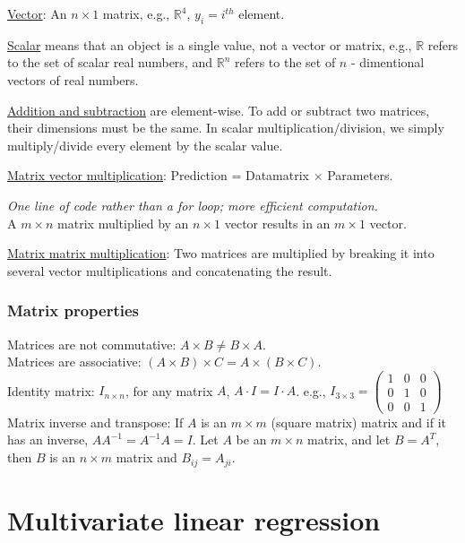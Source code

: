 \underline{Vector}: An $n \times 1$ matrix, e.g., $\mathbb{R}^{4}$, $y_i = i^{th}$ element.

\underline{Scalar} means that an object is a single value, not a vector or matrix, e.g., $\mathbb{R}$ refers to the set of scalar real numbers, and $\mathbb{R}^{n}$ refers to the set of $\mathit{n}$ - dimentional vectors of real numbers.

\underline{Addition and subtraction} are element-wise. To add or subtract two matrices, their dimensions must be the same. In scalar multiplication/division, we simply multiply/divide every element by the scalar value.

\underline{Matrix vector multiplication}: Prediction = Datamatrix $\times$ Parameters. 

\emph{\textcolor{Bittersweet}{One line of code rather than a for loop; more efficient computation.}} \\
A $m \times n$ matrix multiplied by an $n \times 1$ vector results in an $m \times 1$ vector.

\underline{Matrix matrix multiplication}: Two matrices are multiplied by breaking it into several vector multiplications and concatenating the result.

\subsubsection{Matrix properties}
Matrices are not commutative: $A \times B \neq B \times A$.\\
Matrices are associative: $(A \times B) \times C = A \times (B \times C)$. \\
Identity matrix: $I_{n \times n}$, for any matrix $A$, $A \cdot I = I \cdot A$. 
e.g., $I_{3 \times 3} = \begin{pmatrix}
1 & 0 & 0 \\
0 & 1 & 0 \\
0 & 0 & 1
\end{pmatrix}$ \\
Matrix inverse and transpose: If $A$ is an $m \times m$ (square matrix) matrix and if it has an inverse, $AA^{-1} = A^{-1}A = I$. Let $A$ be an $m \times n$ matrix, and let $B = A^{T}$, then $B$ is an $n \times m$ matrix and $B_{ij}=A_{ji}$.

\section{Multivariate linear regression}
\label{sec:Multivariate linear regression}

